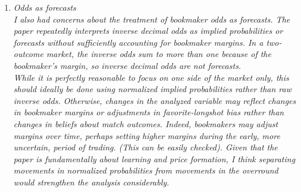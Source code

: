 \documentclass[letterpaper,12pt]{article}
\newcounter{b}
\begin{document}
\begin{enumerate}
\item \textit{Odds as forecasts\\[6pt]
I also had concerns about the treatment of bookmaker odds as forecasts. The paper
repeatedly interprets inverse decimal odds as implied probabilities or forecasts without
sufficiently accounting for bookmaker margins. In a two-outcome market, the inverse
odds sum to more than one because of the bookmaker’s margin, so inverse decimal odds
are not forecasts.\\[6pt]
While it is perfectly reasonable to focus on one side of the market only, this should ideally be done using normalized implied probabilities rather than raw inverse odds. Otherwise, changes in the analyzed variable may reflect changes in bookmaker margins or
adjustments in favorite-longshot bias rather than changes in beliefs about match
outcomes. Indeed, bookmakers may adjust margins over time, perhaps setting higher
margins during the early, more uncertain, period of trading. (This can be easily checked).
Given that the paper is fundamentally about learning and price formation, I think
separating movements in normalized probabilities from movements in the overround
would strengthen the analysis considerably. }


\end{enumerate}
\end{document}
